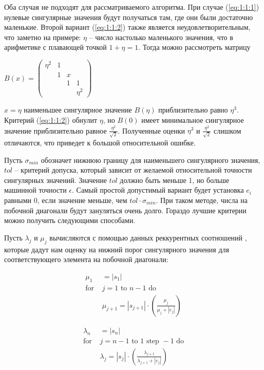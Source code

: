 Оба случая не подходят для рассматриваемого алгоритма. При случае (\ref{eq:1:1:1}) нулевые сингулярные значения будут получаться там, где они были достаточно маленькие. Второй вариант (\ref{eq:1:1:2})  также является неудовлетворительным, что заметно на примере: $\eta$ -- число настолько маленького значения, что в арифметике с плавающей точкой $1+\eta=1$. Тогда можно рассмотреть матрицу
\begin{center}
$B(x)=\begin{pmatrix}
    \eta^2&1&&\\
    &1&x\\
    &&1&1\\
    &&&\eta^2
\end{pmatrix}$
\end{center}

 $x=\eta$ наименьшее сингулярное значение $B(\eta)$ приблизительно равно $\eta^3$. Критерий (\ref{eq:1:1:2}) обнулит $\eta$, но $B(0)$ имеет минимальное сингулярное значение приблизительно равное $\frac{\eta^2}{\sqrt{2}}$. Полученные оценки $\eta^3$ и $\frac{\eta^2}{\sqrt{2}}$ слишком отличаются, что приведет к большой относительной ошибке.

Пусть $\sigma_{min}$ обозначет нижнюю границу для наименьшего сингулярного значения, $tol$ \--- критерий допуска, который зависит от желаемой относительной точности сингулярных значений. Значение $tol$ должно быть меньше 1, но больше машинной точности $\epsilon$. Самый простой допустимый вариант будет установка $e_i$ равными 0, если значение меньше, чем $tol\cdot\sigma_{min}$. При таком методе, числа на побочной диагонали будут зануляться очень долго. Гораздо лучшие критерии можно получить следующими способами.

Пусть $\lambda_j$ и $\mu_j$ вычисляются с помощью данных реккурентных соотношений \cite{Demmel1990}, которые дадут нам оценку на нижний порог сингулярного значения для соответствующего элемента на побочной диагонали:

\begin{minipage}{0.48\textwidth}
\begin{align*}
\mu_1& = |s_1| \\
\text{for }& j = 1 \text{ to } n-1 \text{ do} \\
&\mu_{j+1} = |s_{j+1}| \cdot \left( \frac{\mu_j}{\mu_j + |e_j|} \right)
\end{align*}
\end{minipage}
\hfill
\begin{minipage}{0.48\textwidth}
\begin{align*}
\lambda_n& = |s_n| \\
\text{for }& j = n-1 \text{ to } 1 \text{ step } -1 \text{ do} \\
&\lambda_j = |s_j| \cdot \left( \frac{\lambda_{j+1}}{\lambda_{j+1} + |e_j|} \right)
\end{align*}
\end{minipage}
\vspace{1em}

